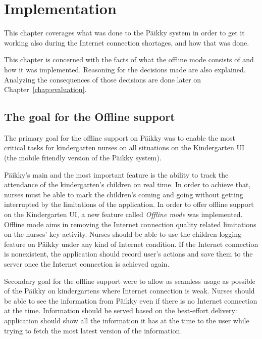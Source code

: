 
\chapter{Implementation}
This chapter coverages what was done to the Päikky system in order to get it working also during the Internet connection shortages, and how that was done. 

This chapter is concerned with the facts of what the offline mode consists of and how it was implemented. Reasoning for the decisions made are also explained. Analyzing the consequences of those decisions are done later on Chapter~\ref{chap:evaluation}.

\section{The goal for the Offline support}


The primary goal for the offline support on Päikky was to enable the most critical tasks for kindergarten nurses on all situations on the Kindergarten UI (the mobile friendly version of the Päikky system). 

Päikky's main and the most important feature is the ability to track the attendance of the kindergarten's children on real time. In order to achieve that, nurses must be able to mark the children's coming and going without getting interrupted by the limitations of the application. In order to offer offline support on the Kindergarten UI, a new feature called \textit{Offline mode} was implemented. Offline mode aims in removing the Internet connection quality related limitations on the nurses' key activity. Nurses should be able to use the children logging feature on Päikky under any kind of Internet condition. If the Internet connection is nonexistent, the application should record user's actions and save them to the server once the Internet connection is achieved again.

Secondary goal for the offline support were to allow as seamless usage as possible of the Päikky on kindergartens where Internet connection is weak. Nurses should be able to see the information from Päikky even if there is no Internet connection at the time. Information should be served based on the best-effort delivery: application should show all the information it has at the time to the user while trying to fetch the most latest version of the information.

